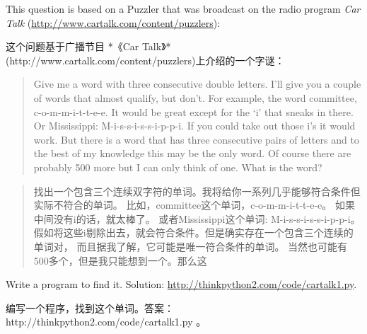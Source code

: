 \begin{exercise}
    

This question is based on a Puzzler that was broadcast on the radio
program {\em Car Talk}
(\url{http://www.cartalk.com/content/puzzlers}):

这个问题基于广播节目 *《Car Talk》* (http://www.cartalk.com/content/puzzlers)上介绍的一个字谜：

\begin{quote}
Give me a word with three consecutive double letters. I'll give you a
couple of words that almost qualify, but don't. For example, the word
committee, c-o-m-m-i-t-t-e-e. It would be great except for the `i' that
sneaks in there. Or Mississippi: M-i-s-s-i-s-s-i-p-p-i. If you could
take out those i's it would work. But there is a word that has three
consecutive pairs of letters and to the best of my knowledge this may
be the only word. Of course there are probably 500 more but I can only
think of one. What is the word?
\end{quote}

\begin{quote}
    找出一个包含三个连续双字符的单词。我将给你一系列几乎能够符合条件但实际不符合的单词。
    比如，committee这个单词，c-o-m-m-i-t-t-e-e。
    如果中间没有i的话，就太棒了。
    或者Mississippi这个单词: M-i-s-s-i-s-s-i-p-p-i。假如将这些i剔除出去，就会符合条件。但是确实存在一个包含三个连续的单词对，
    而且据我了解，它可能是唯一符合条件的单词。
    当然也可能有500多个，但是我只能想到一个。那么这
\end{quote}

Write a program to find it.
Solution: \url{http://thinkpython2.com/code/cartalk1.py}.

编写一个程序，找到这个单词。答案： http://thinkpython2.com/code/cartalk1.py 。

\end{exercise}


